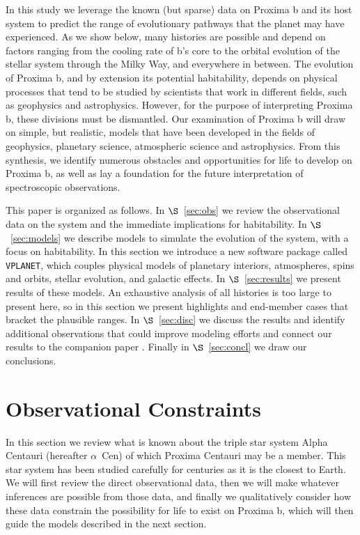 \documentclass[preprint,12pt]{aastex}
\newcommand{\xxx}[1]{{\color{red} #1}} %
\def\acen{{$\alpha$~Cen}}
\def\vplanet{\texttt{\footnotesize{VPLANET}}\xspace}
\begin{document}
In this study we leverage the known (but sparse) data on Proxima b and
its host system to predict the range of evolutionary pathways that the
planet may have experienced. As we show below, many histories are
possible and depend on factors ranging from the cooling rate of b's
core to the orbital evolution of the stellar system through the Milky
Way, \xxx{and everywhere in between}. The evolution of Proxima b, and by
extension its potential habitability, depends on physical processes
that tend to be studied by scientists that work in different
fields, such as geophysics and astrophysics. However, for the purpose
of interpreting Proxima b, these divisions must be dismantled. Our
examination of Proxima b will draw on simple, but realistic, models
that have been developed in the fields of geophysics, planetary
science, atmospheric science and astrophysics. From this synthesis, we
identify numerous obstacles and opportunities for life to develop on
Proxima b, as well as lay a foundation for the future interpretation
of spectroscopic observations.

This paper is organized as follows. In $\S$~\ref{sec:obs} we review
the observational data on the system and the immediate implications
for habitability. In $\S$~\ref{sec:models} we describe models to
simulate the evolution of the system, with a focus on habitability. In
this section we introduce a new software package called \vplanet,
which couples physical models of planetary interiors, atmospheres,
spins and orbits, stellar evolution, and galactic effects. In
$\S$~\ref{sec:results} we present results of these models. An
exhaustive analysis of all histories is too large to present here, so
in this section we present highlights and end-member cases that
bracket the plausible ranges. In $\S$~\ref{sec:disc} we discuss the
results and identify additional observations that could improve
modeling efforts and connect our results to the companion paper
\citep{Meadows16}. Finally in $\S$~\ref{sec:concl} we draw our
conclusions.

\section{Observational Constraints \label{sec:obs}}

In this section we review what is known about the triple star system
Alpha Centauri (hereafter \acen) of which Proxima Centauri may be a
member. This star system has been studied carefully for centuries as
it is the closest to Earth. We will first review the direct
observational data, then we will make whatever inferences are possible
from those data, and finally we qualitatively consider how these data
constrain the possibility for life to exist on Proxima b, which will
then guide the models described in the next section.
\end{document}

